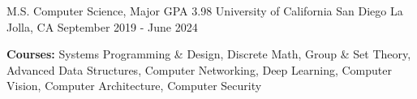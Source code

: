 
\begin{cventries}
  \cventry
    {M.S. Computer Science, Major GPA 3.98}
    {University of California San Diego}
    {La Jolla, CA}
    {September 2019 - June 2024}
    {
      \begin{cvitems}
        \item {\textbf{Courses:} Systems Programming \& Design, Discrete Math, Group \& Set Theory, Advanced Data Structures, Computer Networking, Deep Learning, Computer Vision, Computer Architecture, Computer Security}
      \end{cvitems}
    }
\end{cventries}
